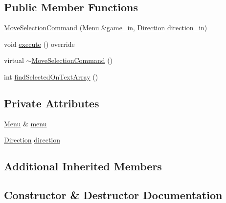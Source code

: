 \subsection*{Public Member Functions}
\begin{DoxyCompactItemize}
\item 
\hyperlink{class_move_selection_command_a13a94357d45090d73e910ad88e34d137}{Move\+Selection\+Command} (\hyperlink{class_menu}{Menu} \&game\+\_\+in, \hyperlink{class_command_a53ddb82f75ac3516b27d8f92f93c5e09}{Direction} direction\+\_\+in)
\item 
void \hyperlink{class_move_selection_command_a0d2117e50adfe980744b3ca883ca7fc5}{execute} () override
\item 
virtual \hyperlink{class_move_selection_command_ae014898c6e01dd18668f79fd96d9b670}{$\sim$\+Move\+Selection\+Command} ()
\item 
int \hyperlink{class_move_selection_command_a6a9d0bed09292f4465c3a09a847ed0be}{find\+Selected\+On\+Text\+Array} ()
\end{DoxyCompactItemize}
\subsection*{Private Attributes}
\begin{DoxyCompactItemize}
\item 
\hyperlink{class_menu}{Menu} \& \hyperlink{class_move_selection_command_a744230c9fb6c308c2f05a08d7c45e4c2}{menu}
\item 
\hyperlink{class_command_a53ddb82f75ac3516b27d8f92f93c5e09}{Direction} \hyperlink{class_move_selection_command_a2dd06420c7d00cd5da4ac920e062f1cd}{direction}
\end{DoxyCompactItemize}
\subsection*{Additional Inherited Members}


\subsection{Constructor \& Destructor Documentation}
\hypertarget{class_move_selection_command_a13a94357d45090d73e910ad88e34d137}{}
